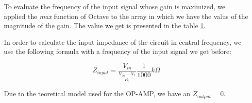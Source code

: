 To evaluate the frequency of the input signal whose gain is maximized, we applied the \textit{max} function of Octave to the array in which
we have the valus of the magnitude of the gain. The value we get is presented in the table \ref*{tab:TheoreticalResults}.

In order to calculate the input impedance of the circuit in central frequency,
we use the following formula with a frequency of the input signal we get before:

\begin{equation}
  Z_{input} = \frac{V_{in}}{\frac{V_{in} - V_1}{R_1}} \frac{1}{1000} k \Omega
\end{equation}

Due to the teoretical model used for the OP-AMP, we have an $Z_{output} = 0$.


\begin{table}[h]
  {
    \centering
    \begin{tabular}{|c|c|c|}
      \hline
      
    \end{tabular}
    \label{tab:TheoreticalResults}
    \caption{ }
  }
\end{table}

